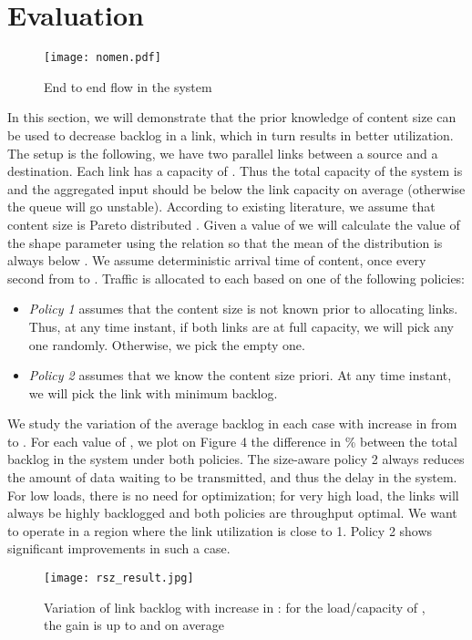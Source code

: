 \documentclass[conference]{IEEEtran}
\begin{document}
\section{Evaluation}
\label{sec:eval}
\begin{figure*}
\centering
\texttt{[image: nomen.pdf]}
\caption{End to end flow in the system}
\label{fig:network}
\end{figure*}
In this section, we will demonstrate that the prior knowledge of content size can be used to decrease backlog in a link, which in turn results in better utilization. The setup is the following, we have two parallel links between a source and a destination. Each link has a capacity of . Thus the total capacity of the system is  and the aggregated input should be below the link capacity on average (otherwise the queue will go unstable). According to existing literature, we assume that content size is Pareto distributed \cite{Arlitt97}. Given a value of  we will calculate the value of the shape parameter using the relation  so that the mean of the distribution is always below . We assume deterministic arrival time of content, once every second from  to . Traffic is allocated to each based on one of the following policies:
\begin{itemize}
\item \emph{Policy 1} assumes that the content size is not known prior to allocating links. Thus, at any time instant, if both links are at full capacity, we will pick any one randomly. Otherwise, we pick the empty one.
\item \emph{Policy 2} assumes that we know the content size priori. At any time instant, we will pick the link with minimum backlog.
\end{itemize}
We study the variation of the average backlog in each case with increase in  from  to . For each value of , we plot on Figure 4 the
difference in \% between the total backlog in the system under
both policies. The size-aware policy 2 always reduces the
amount of data waiting to be transmitted, and thus the delay in
the system. For low loads, there is no need for optimization;
for very high load, the links will always be highly backlogged
and both policies are throughput optimal. We want to operate
in a region where the link utilization is close to 1. Policy 2
shows significant improvements in such a case.
\begin{figure}
\centering
\texttt{[image: rsz\_result.jpg]}
\caption{Variation of link backlog with increase in : for the load/capacity
of , the gain is up to  and  on average}
\label{fig:result}
\end{figure}
\end{document}
